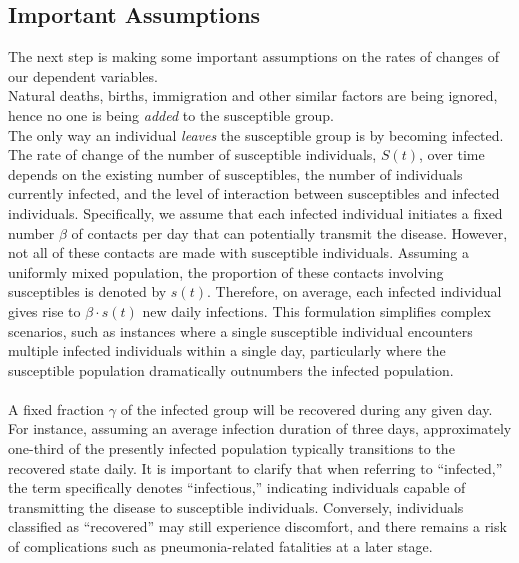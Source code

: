 \subsection{Important Assumptions}
\hspace{\parindent}The next step is making some important assumptions on the rates of changes of our dependent variables.\\
Natural deaths, births, immigration and other similar factors are being ignored, hence no one is being \textit{added} to the susceptible group.\\
The only way an individual \textit{leaves} the susceptible group is by becoming infected.\\
The rate of change of the number of susceptible individuals, $S(t)$, over time depends on the existing number of susceptibles, the number of individuals currently infected, and the level of interaction between susceptibles and infected individuals.
Specifically, we assume that each infected individual initiates a fixed number $\beta$ of contacts per day that can potentially transmit the disease.
However, not all of these contacts are made with susceptible individuals.
Assuming a uniformly mixed population, the proportion of these contacts involving susceptibles is denoted by $s(t)$.
Therefore, on average, each infected individual gives rise to $\beta \cdot s(t)$ new daily infections.
This formulation simplifies complex scenarios, such as instances where a single susceptible individual encounters multiple infected individuals within a single day, particularly where the susceptible population dramatically outnumbers the infected population.\\
\\
A fixed fraction $\gamma$ of the infected group will be recovered during any given day.
For instance, assuming an average infection duration of three days, approximately one-third of the presently infected population typically transitions to the recovered state daily.
It is important to clarify that when referring to ``infected,'' the term specifically denotes ``infectious,'' indicating individuals capable of transmitting the disease to susceptible individuals.
Conversely, individuals classified as ``recovered'' may still experience discomfort, and there remains a risk of complications such as pneumonia-related fatalities at a later stage.





